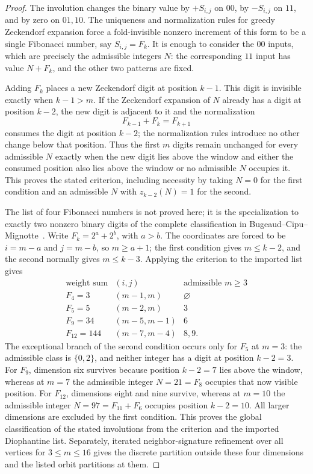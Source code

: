 \documentclass[12pt,a4paper]{article}
\theoremstyle{plain}
\theoremstyle{definition}
\numberwithin{equation}{section}
\begin{document}
\begin{proof}
The involution changes the binary value by \(+S_{i,j}\) on \(00\), by
\(-S_{i,j}\) on \(11\), and by zero on \(01,10\).  The uniqueness and normalization
rules for greedy Zeckendorf expansion force a fold-invisible nonzero increment of this
form to be a single Fibonacci number, say \(S_{i,j}=F_k\).  It is enough to consider
the \(00\) inputs, which are precisely the admissible integers \(N\): the corresponding
\(11\) input has value \(N+F_k\), and the other two patterns are fixed.

Adding \(F_k\) places a new Zeckendorf digit at position \(k-1\).  This digit is
invisible exactly when \(k-1>m\).  If the Zeckendorf expansion of \(N\) already has a
digit at position \(k-2\), the new digit is adjacent to it and the normalization
\[
 F_{k-1}+F_k=F_{k+1}
\]
consumes the digit at position \(k-2\); the normalization rules introduce no other
change below that position.  Thus the first \(m\) digits remain unchanged for every
admissible \(N\)
exactly when the new digit lies above the window and either the consumed position also
lies above the window or no admissible \(N\) occupies it.  This proves the stated
criterion, including necessity by taking \(N=0\) for the first condition and an
admissible \(N\) with \(z_{k-2}(N)=1\) for the second.

The list of four Fibonacci numbers is not proved here; it is the specialization to
exactly two nonzero binary digits of the complete classification in
Bugeaud--Cipu--Mignotte~\cite{bugeaud2013representation}.  Write
\(F_k=2^a+2^b\), with \(a>b\).  The coordinates are forced to be \(i=m-a\) and
\(j=m-b\), so \(m\ge a+1\); the first condition gives \(m\le k-2\), and the second
normally gives \(m\le k-3\).  Applying the criterion to the imported list gives
\[
\begin{array}{c|c|c}
\text{weight sum}&(i,j)&\text{admissible }m\ge3\\ \hline
F_4=3&(m-1,m)&\varnothing\\
F_5=5&(m-2,m)&3\\
F_9=34&(m-5,m-1)&6\\
F_{12}=144&(m-7,m-4)&8,9.
\end{array}
\]
The exceptional branch of the second condition occurs only for \(F_5\) at \(m=3\):
the admissible class is \(\{0,2\}\), and neither integer has a digit at position
\(k-2=3\).  For \(F_9\), dimension six survives because position \(k-2=7\) lies above
the window, whereas at \(m=7\) the admissible integer \(N=21=F_8\) occupies that now
visible position.  For \(F_{12}\), dimensions eight and nine survive, whereas at
\(m=10\) the admissible integer \(N=97=F_{11}+F_6\) occupies position \(k-2=10\).
All larger dimensions are excluded by the first condition.  This proves the global
classification of the stated involutions from the criterion and the imported
Diophantine list.  Separately, iterated neighbor-signature refinement over all vertices
for \(3\le m\le16\) gives the discrete partition outside these four dimensions and the
listed orbit partitions at them.


\end{proof}
\end{document}
